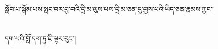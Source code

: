 \chapter{ }སློབ་པ་སྒོམ་པས་སྤང་བར་བྱ་བའི་དྲི་མ་ལུས་པས་དྲི་མ་ཅན་དུ་བྱས་པའི་ཡིད་ཅན་རྣམས་ཀྱང་།\chapter{ }དག་པའི་བློ་དག་ཏུ་ཇི་ལྟར་རུང་།\chapt